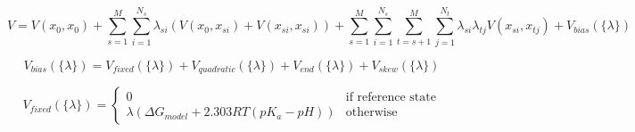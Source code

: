 \documentclass{article}
\begin{document}
\begin{equation*}
        V=V(x_0,x_0)+\sum_{s=1}^{M}\sum_{i=1}^{N_s}\lambda_{si}(V(x_0,x_{si})+V(x_{si},x_{si}))
        +\sum_{s=1}^{M}\sum_{i=1}^{N_s}\sum_{t=s+1}^{M}\sum_{j=1}^{N_t}\lambda_{si}\lambda_{tj}V(x_{si},x_{tj})
        +V_{bias}(\{\lambda\})
  \label{eqn:V_msld}
\end{equation*}

\begin{equation*}
        V_{bias}(\{\lambda\})=V_{fixed}(\{\lambda\})+V_{quadratic}(\{\lambda\})
        +V_{end}(\{\lambda\})+V_{skew}(\{\lambda\})
  \label{eqn:V_bias}
\end{equation*}

\begin{equation*}
	V_{fixed}(\{\lambda\})= \begin{cases}
		0 & \text{if reference state} \\
		\lambda(\Delta G_{model}+2.303RT(pK_a-pH)) & \text{otherwise}
	\end{cases}
  \label{eqn:V_fixed}
\end{equation*}
\end{document}
